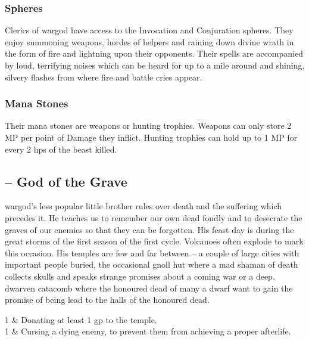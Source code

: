 \begin{multicols}{2}
\subsubsection{Spheres}

Clerics of \Gls{wargod} have access to the Invocation and Conjuration spheres.
They enjoy summoning weapons, hordes of helpers and raining down divine wrath in the form of fire and lightning upon their opponents.
Their spells are accompanied by loud, terrifying noises which can be heard for up to a mile around and shining, silvery flashes from where fire and battle cries appear.

\subsubsection{Mana Stones}

Their mana stones are weapons or hunting trophies.
Weapons can only store 2 MP per point of Damage they inflict.
Hunting trophies can hold up to 1 MP for every 2 \glspl{hp} of the beast killed.

\subsection{ -- God of the Grave}

\noindent \Gls{wargod}'s less popular little brother rules over death and the suffering which precedes it.
He teaches us to remember our own dead fondly and to desecrate the graves of our enemies so that they can be forgotten.
His feast day is during the great storms of the first season of the first cycle.
Volcanoes often explode to mark this occasion.
His temples are few and far between -- a couple of large cities with important people buried, the occasional gnoll hut where a mad shaman of death collects skulls and speaks strange promises about a coming war or a deep, dwarven catacomb where the honoured dead of many a dwarf want to gain the promise of being lead to the halls of the honoured dead.



\iftoggle{verbose}{}{
  \begin{figure*}[t!]
  \begin{footnotesize}
}
\begin{xpchart}{}

  1 & Donating at least 1 gp to the temple. \\

  1 & Cursing a dying enemy, to prevent them from achieving a proper afterlife. \\


\end{xpchart}
\end{multicols}
